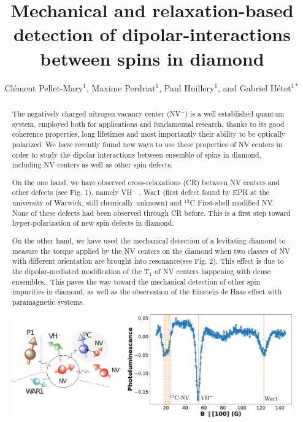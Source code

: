 \documentclass[aps,twocolumn,showpacs]{revtex4-1}
\begin{document}
\title{Mechanical and relaxation-based detection of dipolar-interactions between spins in diamond}

\author{Clément Pellet-Mary$^1$, Maxime Perdriat$^1$, Paul Huillery$^1$, and Gabriel Hétet$^{1*}$}


\begin{abstract}
\normalsize
The negatively charged nitrogen vacancy center (NV$^-$) is a well established quantum system, employed both for applications and fundamental research, thanks to its good coherence properties, long lifetimes and most importantly their ability to be optically polarized.
We have recently found new ways to use these properties of NV centers in order to study the dipolar interactions between ensemble of spins in diamond, including NV centers as well as other spin defects. 

On the one hand, we have observed cross-relaxations (CR) between NV centers and other defects (see Fig. 1), namely VH$^-$ \cite{VH}, War1 (first defect found by EPR at the university of Warwick, still chemically unknown) and $^{13}$C First-shell modified NV. None of these defects had been observed through CR before. This is a first step toward hyper-polarization of new spin defects in diamond.

On the other hand, we have used the mechanical detection of a levitating diamond \cite{nature} to measure the torque applied by the NV centers on the diamond when two classes of NV with different orientation are brought into resonance(see Fig. 2). This effect is due to the dipolar-mediated modification of the T$_1$ of NV centers happening with dense ensembles.\cite{Lukin}. This paves the way toward the mechanical detection of other spin impurities in diamond, as well as the observation of the Einstein-de Haas effect with paramagnetic systems. \cite{Meriles}

\begin{center}
\includegraphics[scale=.25]{CR_total}
\end{center}


\end{abstract}
\end{document}
